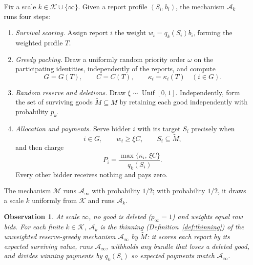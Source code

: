 \documentclass[format=acmsmall, review=false]{acmart}
\theoremstyle{acmdefinition}%
\newtheorem{observation}[theorem]{Observation}%
\begin{document}
\begin{definition}
\label{def:M}
Fix a scale \(k\in\mathcal K\cup\{\infty\}\). Given a report
profile \((S_i,b_i)\), the mechanism \(\mathcal A_k\) runs four
steps:
\begin{enumerate}
\item \emph{Survival scoring.} Assign report \(i\) the weight
\(w_i=q_k(S_i)b_i\), forming the weighted profile \(T\).
\item \emph{Greedy packing.} Draw a uniformly random priority
order \(\omega\) on the participating identities, independently of
the reports, and compute
\[
G=G(T),\qquad
C=C(T),\qquad
\kappa_i=\kappa_i(T)\quad(i\in G).
\]
\item \emph{Random reserve and deletions.} Draw
\(\xi\sim\operatorname{Unif}[0,1]\). Independently, form the set
of surviving goods \(\widetilde M\subseteq M\) by retaining each
good independently with probability \(p_k\).
\item \emph{Allocation and payments.} Serve bidder \(i\) with its
target \(S_i\) precisely when
\[
i\in G,\qquad w_i\ge\xi C,\qquad S_i\subseteq\widetilde M,
\]
and then charge
\begin{equation}\label{eq:actual-payment}
P_i=\frac{\max\{\kappa_i,\,\xi C\}}{q_k(S_i)}.
\end{equation}
Every other bidder receives nothing and pays zero.
\end{enumerate}
The mechanism \(\mathcal M\) runs \(\mathcal A_\infty\) with
probability \(1/2\); with probability \(1/2\), it draws a scale
\(k\) uniformly from \(\mathcal K\) and runs \(\mathcal A_k\).
\end{definition}

\begin{observation}\label{obs:thinning-view}
At scale \(\infty\), no good is deleted (\(p_\infty=1\)) and
weights equal raw bids. For each finite \(k\in\mathcal K\),
\(\mathcal A_k\) is the thinning (Definition~\ref{def:thinning})
of the unweighted reserve-greedy mechanism \(\mathcal A_\infty\)
by \(\widetilde M\): it scores each report by its expected
surviving value, runs \(\mathcal A_\infty\), withholds any bundle
that loses a deleted good, and divides winning payments by
\(q_k(S_i)\) so expected payments match \(\mathcal A_\infty\).
\end{observation}
\end{document}
